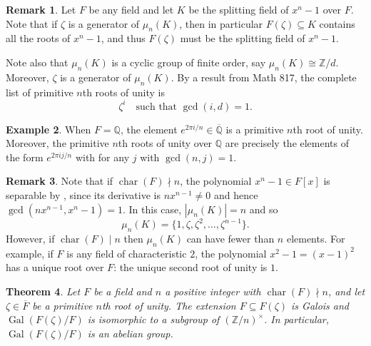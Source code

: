 \documentclass[12pt]{report}
\newtheorem{theorem}{Theorem}[chapter]
\numberwithin{equation}{section}
\numberwithin{theorem}{chapter}
\theoremstyle{definition}
\newtheorem{example}[theorem]{Example}
\newtheorem*{basic properties}{Basic Properties}
\newtheorem*{Important Remark}{Important Remark}
\newtheorem{remark}[theorem]{Remark}
\DeclareMathOperator{\Gal}{Gal}
\newcommand{\Z}{\mathbb{Z}}
\newcommand{\Q}{\mathbb{Q}}
\DeclareMathOperator{\ch}{char}
\begin{document}
\begin{remark}
Let $F$ be any field and let $K$ be the splitting field of $x^n - 1$ over $F$. Note that if $\zeta$ is a generator of $\mu_n(K)$, then in particular $F(\zeta) \subseteq K$ contains all the roots of $x^n-1$, and thus $F(\zeta)$ must be the splitting field of $x^n-1$.

Note also that $\mu_n(K)$ is a cyclic group of finite order, say $\mu_n(K) \cong \Z/d$. Moreover, $\zeta$ is a generator of $\mu_n(K)$. By a result from Math 817, the complete list of primitive $n$th roots of unity is 
$$\zeta^i \quad \textrm{such that } \gcd(i,d) = 1.$$
\end{remark}



\begin{example}
When $F = \Q$, the element $e^{2 \pi i/n} \in \overline{\Q}$ is a primitive $n$th root of unity. Moreover, the primitive $n$th roots of unity over $\Q$ are precisely the elements of the form $e^{2 \pi i j/n}$ with for any $j$ with $\gcd(n, j) = 1$.
\end{example}

\begin{remark}\label{primitive root generates splitting field}
Note that if $\ch(F) \nmid n$, the polynomial $x^n - 1 \in F[x]$ is separable by , since its derivative is $nx^{n-1} \neq 0$ and hence $\gcd(nx^{n-1}, x^n - 1) = 1$. In this case, $|\mu_n(K)|=n$ and so 
$$\mu_n(K) =\{1, \zeta, \zeta^2,\ldots, \zeta^{n-1}\}.$$
However, if $\ch(F) \mid n$ then $\mu_n(K)$ can have fewer than $n$ elements. For example, if $F$ is any field of characteristic $2$, the polynomial $x^2-1=(x-1)^2$ has a unique root over $F$: the unique second root of unity is $1$.
\end{remark}



\begin{theorem}\label{primitive roots unity galois abelian}
Let $F$ be a field and $n$ a positive integer with $\ch(F) \nmid n$, and let $\zeta \in \overline{F}$ be a primitive $n$th root of unity. The extension $F \subseteq F(\zeta)$ is Galois and $\Gal(F(\zeta)/F)$ is isomorphic to a subgroup of $(\Z/n)^\times$. In particular, $\Gal(F(\zeta)/F)$ is an abelian group.
\end{theorem}
\end{document}
